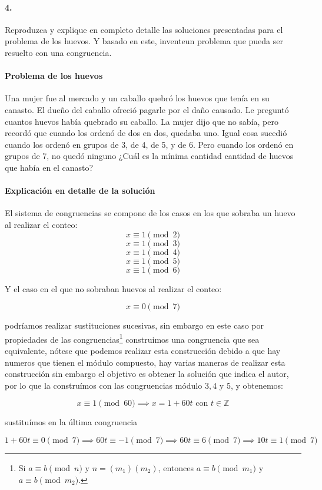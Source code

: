 \documentclass{article}
\begin{document}
\paragraph{4.} Reproduzca y explique en completo detalle las soluciones presentadas para el problema de los huevos. Y basado en este, inventeun problema que pueda ser resuelto con una congruencia.

\paragraph{Problema de los huevos} Una mujer fue al mercado y un caballo quebró los huevos que tenía en su canasto. El dueño del caballo ofreció pagarle por el daño causado. Le preguntó cuantos huevos había quebrado su caballo. La mujer dijo que no sabía, pero recordó que cuando los ordenó de dos en dos, quedaba uno. Igual cosa sucedió cuando los ordenó en grupos de 3, de 4, de 5, y de 6. Pero cuando los ordenó en grupos de 7, no quedó ninguno ¿Cuál es la mínima cantidad cantidad de huevos que había en el canasto?

\paragraph{Explicación en detalle de la solución} El sistema de congruencias se compone de los  casos en los que sobraba un huevo al realizar el conteo:
	$$x \equiv 1 \pmod{2}$$
	$$x \equiv 1 \pmod{3}$$
	$$x \equiv 1 \pmod{4}$$
	$$x \equiv 1 \pmod{5}$$
	$$x \equiv 1 \pmod{6}$$

Y el caso en el que no sobraban huevos al realizar el conteo:

	$$x \equiv 0 \pmod{7}$$

podríamos realizar sustituciones sucesivas, sin embargo en este caso por propiedades de las congruencias\footnote{Si $a \equiv b \pmod{n}$ y $n = (m_1)(m_2)$, entonces $a \equiv b \pmod{m_1}$ y $a \equiv b \pmod{m_2}$.} construimos una congruencia que sea equivalente, nótese que podemos realizar esta construcción debido a que hay numeros que tienen el módulo compuesto, hay varias maneras de realizar esta construcción sin embargo el objetivo es obtener la solución que indica el autor, por lo que la construímos con las congruencias módulo $3,4$ y $5$, y obtenemos:

$$x \equiv 1 \pmod{60}  \implies x = 1 + 60t \text{ con } t \in \mathbb{Z}$$

sustituímos en la última congruencia

$$ 1 + 60t \equiv 0 \pmod{7} \implies 60t \equiv -1 \pmod{7} \implies 60t \equiv 6 \pmod{7} \implies 10t \equiv 1 \pmod{7}$$
\end{document}
